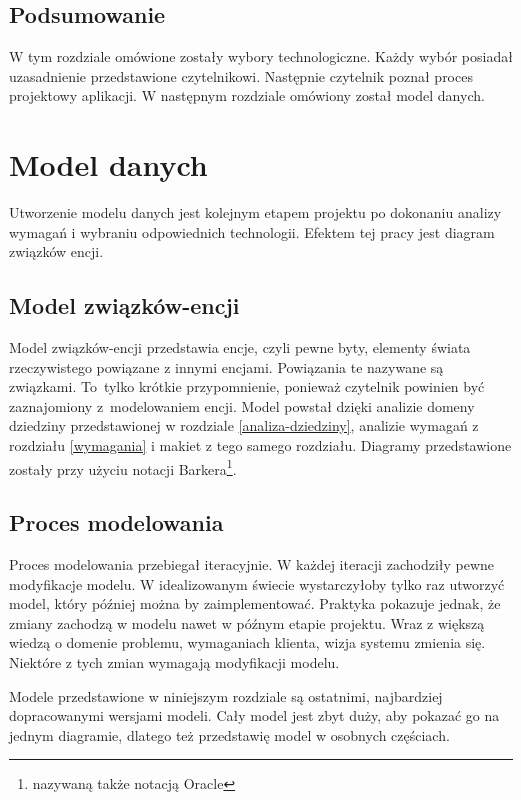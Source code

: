 \documentclass[a4paper,onecolumn,oneside,11pt,wide,floatssmall]{mwrep}
\theoremstyle{definition}
\theoremstyle{plain}%
\theoremstyle{remark}
\begin{document}
\section{Podsumowanie}
W tym rozdziale omówione zostały wybory technologiczne. Każdy wybór posiadał uzasadnienie przedstawione czytelnikowi. Następnie czytelnik poznał proces projektowy aplikacji. W następnym rozdziale omówiony został model danych.


\chapter{Model danych}
Utworzenie modelu danych jest kolejnym etapem projektu po dokonaniu analizy wymagań i wybraniu odpowiednich technologii. Efektem tej pracy jest diagram związków encji.

\section{Model związków-encji}
Model związków-encji przedstawia encje, czyli pewne byty, elementy świata rzeczywistego powiązane z innymi encjami. Powiązania te nazywane są związkami. \mbox{To tylko} krótkie przypomnienie, ponieważ czytelnik powinien być zaznajomiony \mbox{z modelowaniem} encji. 
Model powstał dzięki analizie domeny dziedziny przedstawionej w rozdziale \ref{analiza-dziedziny}, analizie wymagań z rozdziału \ref{wymagania} i makiet z tego samego rozdziału. Diagramy przedstawione zostały przy użyciu notacji Barkera\footnote{nazywaną także notacją Oracle}.

\section{Proces modelowania}
Proces modelowania przebiegał iteracyjnie. W każdej iteracji zachodziły pewne modyfikacje modelu. W idealizowanym świecie wystarczyłoby tylko raz utworzyć model, który później można by zaimplementować. Praktyka pokazuje jednak, że zmiany zachodzą w modelu nawet w późnym etapie projektu. Wraz z większą wiedzą o domenie problemu, wymaganiach klienta, wizja systemu zmienia się. Niektóre z tych zmian wymagają modyfikacji modelu. 

Modele przedstawione w niniejszym rozdziale są ostatnimi, najbardziej dopracowanymi wersjami modeli. Cały model jest zbyt duży, aby pokazać go na jednym diagramie, dlatego też przedstawię model w osobnych częściach.
\end{document}
